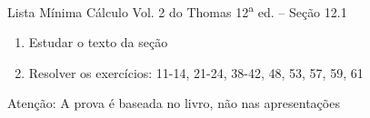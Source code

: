 \documentclass[fleqn,utf8,aspectratio=169,12pt]{beamer}
\begin{document}
\begin{frame}{Lista Mínima}
  Cálculo Vol. 2 do Thomas 12\textsuperscript{a} ed. -- Seção 12.1
  \begin{enumerate}
    \item Estudar o texto da seção
    \item Resolver os exercícios: 11-14, 21-24, 38-42, 48, 53, 57, 59, 61
  \end{enumerate}

  \vfill
  Atenção: A prova é baseada no livro, não nas apresentações
\end{frame}

\end{document}
